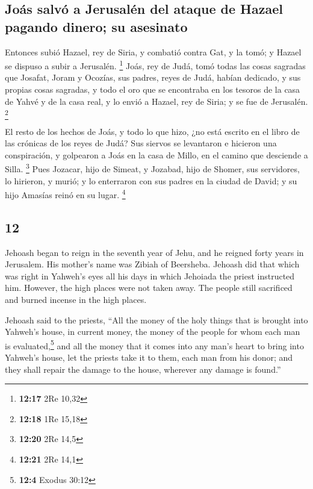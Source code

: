 \begin{paracol}{2}
\hypertarget{jouxe1s-salvuxf3-a-jerusaluxe9n-del-ataque-de-hazael-pagando-dinero-su-asesinato}{%
\subsection{Joás salvó a Jerusalén del ataque de Hazael pagando dinero;
su
asesinato}\label{jouxe1s-salvuxf3-a-jerusaluxe9n-del-ataque-de-hazael-pagando-dinero-su-asesinato}}

 Entonces subió Hazael, rey de Siria, y combatió contra
Gat, y la tomó; y Hazael se dispuso a subir a Jerusalén. \footnote{\textbf{12:17}
  2Re 10,32}  Joás, rey de Judá, tomó todas las cosas
sagradas que Josafat, Joram y Ocozías, sus padres, reyes de Judá, habían
dedicado, y sus propias cosas sagradas, y todo el oro que se encontraba
en los tesoros de la casa de Yahvé y de la casa real, y lo envió a
Hazael, rey de Siria; y se fue de Jerusalén. \footnote{\textbf{12:18}
  1Re 15,18}

 El resto de los hechos de Joás, y todo lo que hizo, ¿no
está escrito en el libro de las crónicas de los reyes de Judá?
 Sus siervos se levantaron e hicieron una conspiración, y
golpearon a Joás en la casa de Millo, en el camino que desciende a
Silla. \footnote{\textbf{12:20} 2Re 14,5}  Pues Jozacar,
hijo de Simeat, y Jozabad, hijo de Shomer, sus servidores, lo hirieron,
y murió; y lo enterraron con sus padres en la ciudad de David; y su hijo
Amasías reinó en su lugar. \footnote{\textbf{12:21} 2Re 14,1}

\switchcolumn
\begin{otherlanguage}{english}

\hypertarget{section-23}{%
\section{12}\label{section-23}}

 Jehoash began to reign in the seventh year of Jehu, and
he reigned forty years in Jerusalem. His mother's name was Zibiah of
Beersheba.  Jehoash did that which was right in Yahweh's
eyes all his days in which Jehoiada the priest instructed him.
 However, the high places were not taken away. The people
still sacrificed and burned incense in the high places.

 Jehoash said to the priests, ``All the money of the holy
things that is brought into Yahweh's house, in current money, the money
of the people for whom each man is evaluated,\footnote{\textbf{12:4}
  Exodus 30:12} and all the money that it comes into any man's heart to
bring into Yahweh's house,  let the priests take it to
them, each man from his donor; and they shall repair the damage to the
house, wherever any damage is found.''


\end{otherlanguage}
\end{paracol}
